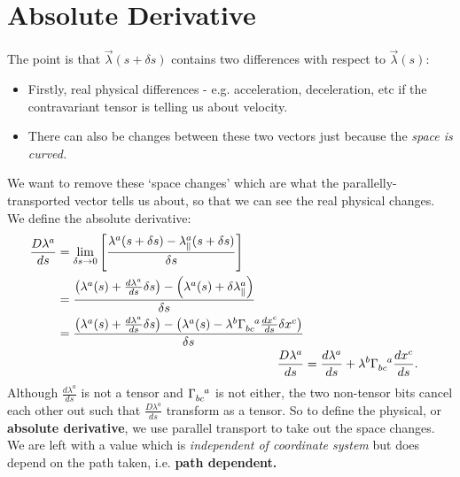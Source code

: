 \documentclass[a4paper, 11pt, normalem]{report}
\begin{document}
\section{Absolute Derivative}
The point is that $\vec{\lambda}(s+\delta s)$ contains two differences with respect to $\vec{\lambda}(s)$:
\begin{itemize}
    \item Firstly, real physical differences - e.g. acceleration, deceleration, etc if the contravariant tensor is telling us about velocity.
    \item There can also be changes between these two vectors just because the \emph{space is curved.}
\end{itemize}
We want to remove these `space changes' which are what the parallelly-transported vector tells us about, so that we can see the real physical changes.
We define the absolute derivative:
\begin{align}
    \begin{split}
    \frac{D\lambda^a}{ds} &= \lim_{\delta s\to0}\left[\frac{\lambda^a(s+\delta s)-\lambda_{\parallel}^a(s+\delta s)}{\delta s}\right] \\
                          &= \frac{\left(\lambda^a(s)+\frac{d\lambda^a}{ds}\delta s\right) - \left(\lambda^a(s)+\delta\lambda_{\parallel}^a\right)}{\delta s} \\
                          &= \frac{\left(\lambda^a(s)+\frac{d\lambda^a}{ds}\delta s\right) - \left(\lambda^a(s)-\lambda^b\tensor{\Gamma}{_{bc}^a}\frac{dx^c}{ds}\delta x^c\right)}{\delta s}
    \end{split}\\
    \frac{D\lambda^a}{ds} &= \frac{d\lambda^a}{ds}+\lambda^b\tensor{\Gamma}{_{bc}^a}\frac{dx^c}{ds}.
\end{align}
Although $\frac{d\lambda^a}{ds}$ is not a tensor and $\tensor{\Gamma}{_{bc}^a}$ is not either, the two non-tensor bits cancel each other out such that $\frac{D\lambda^a}{ds}$  transform as a tensor. 
So to define the physical, or \textbf{absolute derivative}, we use parallel transport to take out the space changes. 
We are left with a value which is \emph{independent of coordinate system} but does depend on the path taken, i.e. \textbf{path dependent.}
\end{document}

